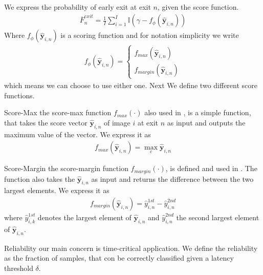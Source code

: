 \begin{enumdescript}
		We express the probability of early exit at exit $ n $, given the score function. 
		\begin{align}
		\overline{F}^{exit}_n = \frac{1}{I}\sum_{i=1}^{I} \mathbb{I} \left(\gamma-f_{\phi}\left(\bm{\hat{y}}_{i,n}\right) \right)
		\end{align}
		Where $ f_\phi\left(\bm{\hat{y}}_{i,n}\right) $ is a scoring function and for notation simplicity we write 
		\begin{align}
			f_{\phi}\left(\bm{\hat{y}}_{i,n}\right) = \begin{cases}
			 	f_{max}\left(\bm{\hat{y}}_{i,n}\right)\\
			 	f_{margin}\left(\bm{\hat{y}}_{i,n}\right)
			\end{cases}
		\end{align}
		which means we can choose to use either one. Next We define two different score functions.
		
		\begin{enumdescript}
			\item[Score-Max] the score-max function $ f_{max}(\cdot)$ also used in \cite{leroux_resource-constrained_2015}, is a simple function, that takes the score vector $ \bm{\hat{y}}_{i,n} $ of image $ i $ at exit $ n $ as input and outputs the maximum value of the vector. We express it as 
			\begin{align}
			f_{max}\left(\bm{\hat{y}}_{i,n}\right) = \underset{c}{\max} \bm{\hat{y}}_{i,n}
			\end{align}
			\item[Score-Margin] the score-margin function $ f_{margin}(\cdot)$, is defined and used in \cite{park_big/little_2015}. The function also takes the $ \bm{\hat{y}}_{i,n} $ as input and returns the difference between the two largest elements. We express it as
			\begin{align}
			f_{margin}\left(\bm{\hat{y}}_{i,n}\right) = \hat{y}_{i,n}^{1st} - \hat{y}_{i,n}^{2nd}
			\end{align}
			where $ \hat{y}_{i,k}^{1st} $ denotes the largest element of $ \bm{\hat{y}}_{i,n} $ 
			and $ \hat{y}_{i,n}^{2nd} $ the second largest element of $ \bm{\hat{y}}_{i,n} $.
			
		\end{enumdescript}
	
	\item[Reliability] our main concern is time-critical application. We define the reliability as the fraction of samples, that con be correctly classified given a latency threshold $ \delta $.
	

\end{enumdescript}

